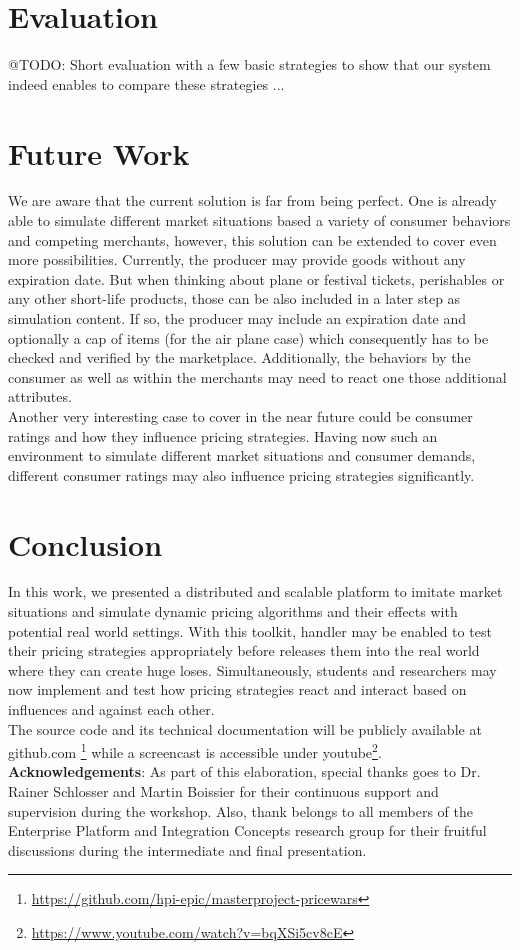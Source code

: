 %
\section{Evaluation}
\label{sec:evaluation}
%
@TODO: Short evaluation with a few basic strategies to show that our system indeed enables to compare these strategies ... 

\section{Future Work}
\label{sec:Future_Work}
%
We are aware that the current solution is far from being perfect. One is already able to simulate different market situations based a variety of consumer behaviors and competing merchants, however, this solution can be extended to cover even more possibilities. Currently, the producer may provide goods without any expiration date. But when thinking about plane or festival tickets, perishables or any other short-life products, those can be also included in a later step as simulation content. If so, the producer may include an expiration date and optionally a cap of items (for the air plane case) which consequently has to be checked and verified by the marketplace. Additionally, the behaviors by the consumer as well as within the merchants may need to react one those additional attributes.\\

Another very interesting case to cover in the near future could be consumer ratings and how they influence pricing strategies. Having now such an environment to simulate different market situations and consumer demands, different consumer ratings may also influence pricing strategies significantly.

\section{Conclusion}
\label{sec:conclusion}
%
In this work, we presented a distributed and scalable platform to imitate market situations and simulate dynamic pricing algorithms and their effects with potential real world settings. With this toolkit, handler may be enabled to test their pricing strategies appropriately before releases them into the real world where they can create huge loses. Simultaneously, students and researchers may now implement and test how pricing strategies react and interact based on influences and against each other.\\

The source code and its technical documentation will be publicly available at github.com \footnote{\url{https://github.com/hpi-epic/masterproject-pricewars}}
while a screencast is accessible under youtube\footnote{\url{https://www.youtube.com/watch?v=bqXSi5cv8cE}}.\\

\textbf{Acknowledgements}:
As part of this elaboration, special thanks goes to Dr. Rainer Schlosser and Martin Boissier for their continuous support and supervision during the workshop. Also, thank belongs to all members of the Enterprise Platform and Integration Concepts research group for their fruitful discussions during the intermediate and final presentation.